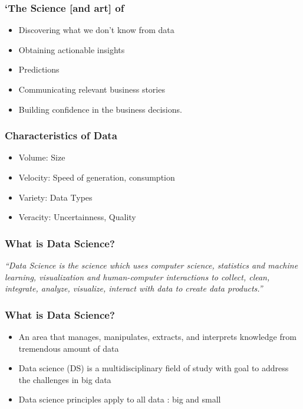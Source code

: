 \begin{frame}[fragile]\frametitle{`The Science [and art] of}
\begin{itemize}
\item Discovering what we don't know from data
\item Obtaining actionable insights
\item Predictions
\item Communicating relevant business stories
\item Building confidence in the business decisions.
\end{itemize}
\end{frame}



\begin{frame}[fragile]\frametitle{Characteristics of Data}
\begin{itemize}
\item Volume: Size
\item Velocity: Speed of generation, consumption
\item Variety: Data Types
\item Veracity: Uncertainness, Quality
\end{itemize}
\end{frame}

\begin{frame}[fragile]\frametitle{What is Data Science?}
\begin{center}
{\em ``Data Science is the science which uses computer science, statistics and machine learning, visualization and human-computer interactions to collect, clean, integrate, analyze, visualize, interact with data to create data products.''}
\end{center}
\end{frame}



\begin{frame}[fragile]\frametitle{What is Data Science?}
\begin{itemize}
\item An area that manages, manipulates, extracts, and interprets knowledge from tremendous amount of data
\item Data science (DS) is a multidisciplinary field of study with goal to address the challenges in big data
\item Data science principles apply to all data : big and small

\end{itemize}
\end{frame}


